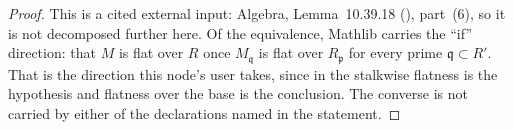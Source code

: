 \begin{proof}
This is a cited external input: Algebra, Lemma~10.39.18
(), part~(6), so it is not decomposed further here.
Of the equivalence, Mathlib carries the ``if'' direction: that $M$ is
flat over $R$ once $M_{\mathfrak q}$ is flat over $R_{\mathfrak p}$ for
every prime $\mathfrak q\subset R'$.  That is the direction this node's
user takes, since in  the stalkwise
flatness is the hypothesis and flatness over the base is the conclusion.
The converse is not carried by either of the declarations named in the
statement.
\end{proof}

